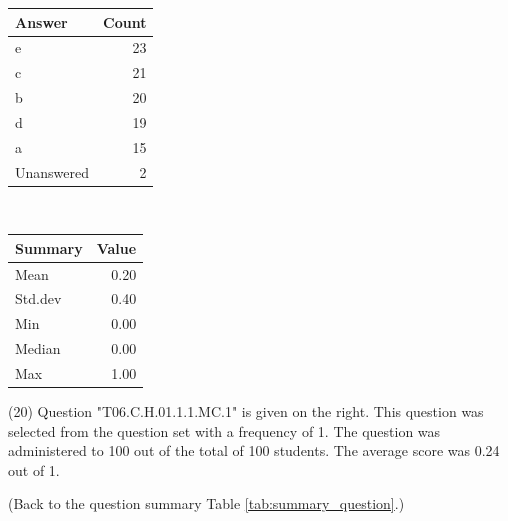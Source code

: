 \documentclass[12pt,nohyper]{tufte-handout}\usepackage[]{graphicx}\usepackage[]{color}
\begin{document}
\begin{center}%
\begin{tabular}{lr}
  \hline
Answer & Count \\ 
  \hline
e &  23 \\ 
  c &  21 \\ 
  b &  20 \\ 
  d &  19 \\ 
  a &  15 \\ 
  Unanswered &   2 \\ 
   \hline
\end{tabular}
~~~~~~~~%
\begin{tabular}{lr}
  \hline
Summary & Value \\ 
  \hline
Mean & 0.20 \\ 
  Std.dev & 0.40 \\ 
  Min & 0.00 \\ 
  Median & 0.00 \\ 
  Max & 1.00 \\ 
   \hline
\end{tabular}
\end{center}\newpage{} (20) Question "T06.C.H.01.1.1.MC.1" is given on the right. This question was selected from the question set with a frequency of 1. The question was administered to 100 out of the total of 100 students. The average score was 0.24 out of 1.

 (Back to the question summary Table \ref{tab:summary_question}.)
\end{document}
